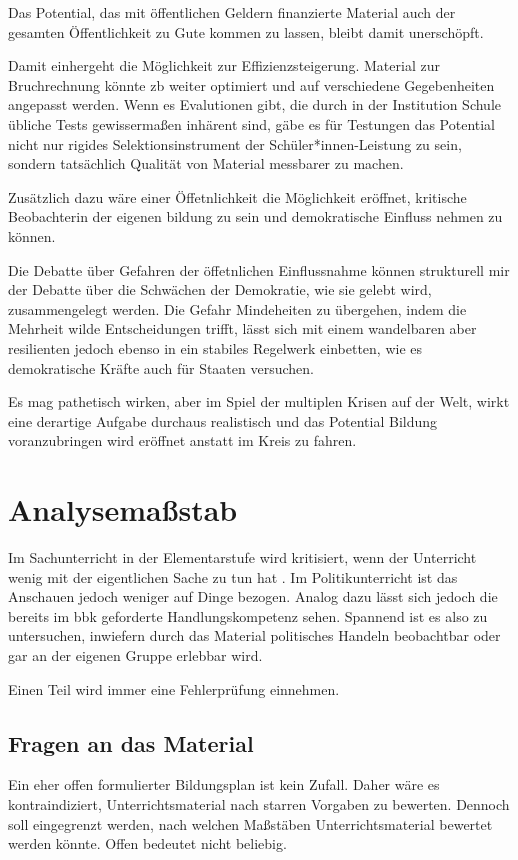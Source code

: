 Das Potential, das mit öffentlichen Geldern finanzierte Material auch der gesamten Öffentlichkeit zu Gute kommen zu lassen, bleibt damit unerschöpft.

Damit einhergeht die Möglichkeit zur Effizienzsteigerung. Material zur Bruchrechnung könnte \gls{zb} weiter optimiert und auf verschiedene Gegebenheiten angepasst werden. Wenn es Evalutionen gibt, die durch in der Institution Schule übliche Tests gewissermaßen inhärent sind, gäbe es für Testungen das Potential nicht nur rigides Selektionsinstrument der Schüler*innen-Leistung zu sein, sondern tatsächlich Qualität von Material messbarer zu machen. 

Zusätzlich dazu wäre einer Öffetnlichkeit die Möglichkeit eröffnet, kritische Beobachterin der eigenen bildung zu sein und demokratische Einfluss nehmen zu können. 

Die Debatte über Gefahren der öffetnlichen Einflussnahme können strukturell mir der Debatte über die Schwächen der Demokratie, wie sie gelebt wird, zusammengelegt werden. Die Gefahr Mindeheiten zu übergehen, indem die Mehrheit wilde Entscheidungen trifft, lässt sich mit einem wandelbaren aber resilienten jedoch ebenso in ein stabiles Regelwerk einbetten, wie es demokratische Kräfte auch für Staaten versuchen. 

Es mag pathetisch wirken, aber im Spiel der multiplen Krisen auf der Welt, wirkt eine derartige Aufgabe durchaus realistisch und das Potential Bildung voranzubringen wird eröffnet anstatt im Kreis zu fahren. 



\section{Analysemaßstab}
Im Sachunterricht in der Elementarstufe wird kritisiert, wenn der Unterricht wenig mit der eigentlichen Sache zu tun hat \autocite[2-4]{Scholz2004}. Im Politikunterricht ist das Anschauen jedoch weniger auf Dinge bezogen. Analog dazu lässt sich jedoch die bereits im \gls{bbk} geforderte Handlungskompetenz sehen. Spannend ist es also zu untersuchen, inwiefern durch das Material politisches Handeln beobachtbar oder gar an der eigenen Gruppe erlebbar wird.


Einen Teil wird immer eine Fehlerprüfung einnehmen. 



\subsection{Fragen an das Material} %
Ein eher offen formulierter Bildungsplan ist kein Zufall. %
Daher wäre es kontraindiziert, Unterrichtsmaterial nach starren Vorgaben zu bewerten.
Dennoch soll eingegrenzt werden, nach welchen Maßstäben Unterrichtsmaterial bewertet werden könnte. Offen bedeutet nicht beliebig.

